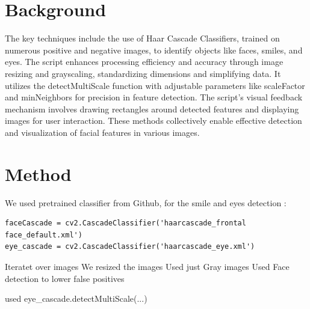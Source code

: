 \documentclass[11pt, a4paper, twocolumn]{article}
\begin{document}
\section*{Background}
 The key techniques include the use of Haar Cascade Classifiers, trained on numerous positive and negative images, to identify objects like faces, smiles, and eyes. The script enhances processing efficiency and accuracy through image resizing and grayscaling, standardizing dimensions and simplifying data. It utilizes the detectMultiScale function with adjustable parameters like scaleFactor and minNeighbors for precision in feature detection. The script's visual feedback mechanism involves drawing rectangles around detected features and displaying images for user interaction. These methods collectively enable effective detection and visualization of facial features in various images.

\section*{Method}
We used pretrained classifier from Github, for the smile and eyes detection \cite{OpencvDataHaarcascades}:
\begin{lstlisting}
faceCascade = cv2.CascadeClassifier('haarcascade_frontal face_default.xml')
eye_cascade = cv2.CascadeClassifier('haarcascade_eye.xml')
\end{lstlisting}

Iteratet over images
We resized the images
Used just Gray images
Used Face detection to lower false positives

used eye\_cascade.detectMultiScale(...)
\end{document}
